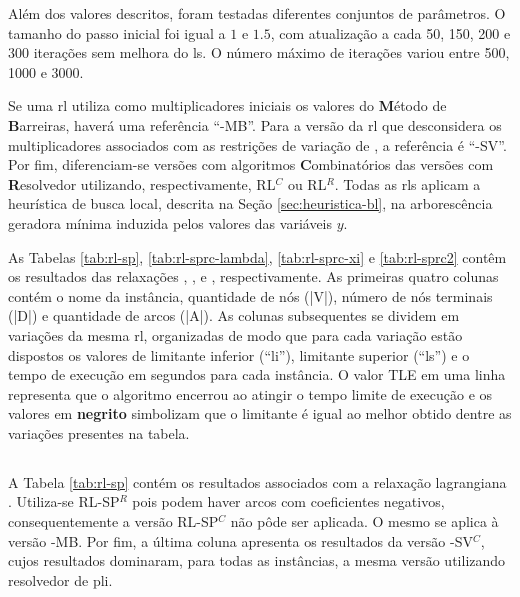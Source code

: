 Além dos valores descritos, foram testadas diferentes conjuntos de parâmetros. O
tamanho do  passo inicial foi igual  a $1$ e  $1.5$, com atualização a  cada 50,
150, 200 e 300  iterações sem melhora do \gls{ls}. O  número máximo de iterações
variou entre 500, 1000 e 3000.

Se  uma   \gls{rl}  utiliza   como  multiplicadores   iniciais  os   valores  do
\textbf{M}étodo  de \textbf{B}arreiras,  haverá uma  referência ``-MB''.  Para a
versão  da  \gls{rl}  que  desconsidera os  multiplicadores  associados  com  as
restrições  de  variação   de  {\delay},  a  referência  é   ``-SV''.  Por  fim,
diferenciam-se  versões com  algoritmos \textbf{C}ombinatórios  das versões  com
\textbf{R}esolvedor utilizando, respectivamente, RL$^{C}$  ou RL$^{R}$. Todas as
\gls{rl}s   aplicam   a  heurística   de   busca   local,  descrita   na   Seção
\ref{sec:heuristica-bl}, na arborescência geradora mínima induzida pelos valores
das variáveis $y$.

As  Tabelas  \ref{tab:rl-sp}, \ref{tab:rl-sprc-lambda},  \ref{tab:rl-sprc-xi}  e
\ref{tab:rl-sprc2}  contêm os  resultados das  relaxações {\rlu,  \rld, \rlt}  e
{\rlq}, respectivamente. As primeiras quatro colunas contém o nome da instância,
quantidade de  nós (|V|), número  de nós terminais  (|D|) e quantidade  de arcos
(|A|).  As colunas  subsequentes  se  dividem em  variações  da mesma  \gls{rl},
organizadas  de modo  que  para  cada variação  estão  dispostos  os valores  de
limitante inferior  (``\gls{li}''), limitante superior (``\gls{ls}'')  e o tempo
de execução em segundos para cada instância. O valor TLE em uma linha representa
que o algoritmo encerrou  ao atingir o tempo limite de execução  e os valores em
\textbf{negrito} simbolizam que  o limitante é igual ao melhor  obtido dentre as
variações presentes na tabela.

\subsection{\rlu}

A  Tabela  \ref{tab:rl-sp}  contém  os resultados  associados  com  a  relaxação
lagrangiana {\rlu}. Utiliza-se RL-SP$^R$ pois podem haver arcos com coeficientes
negativos, consequentemente a versão RL-SP$^C$ não pôde ser aplicada. O mesmo se
aplica à versão  {\rlu}-MB. Por fim, a última coluna  apresenta os resultados da
versão {\rlu}-SV$^C$,  cujos resultados dominaram,  para todas as  instâncias, a
mesma versão utilizando resolvedor de \gls{pli}.

